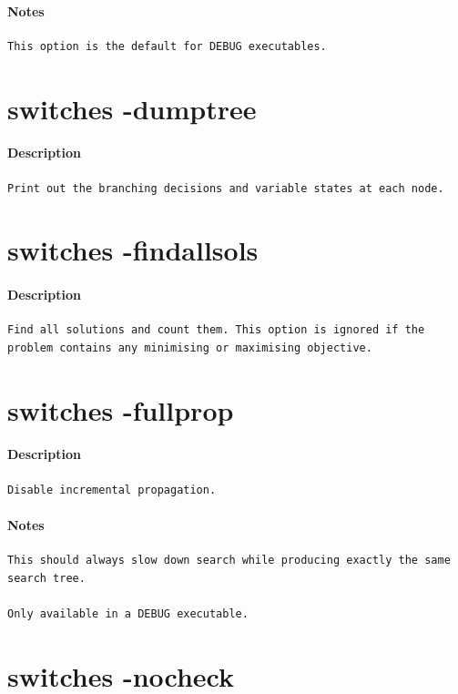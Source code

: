 \documentclass[oneside]{book}
\begin{document}
\paragraph{Notes}
{\footnotesize
\begin{verbatim}
This option is the default for DEBUG executables.
\end{verbatim}
}
\section{switches -dumptree}
\paragraph{Description}
{\footnotesize
\begin{verbatim}
Print out the branching decisions and variable states at each node.
\end{verbatim}
}
\section{switches -findallsols}
\paragraph{Description}
{\footnotesize
\begin{verbatim}
Find all solutions and count them. This option is ignored if the
problem contains any minimising or maximising objective.
\end{verbatim}
}
\section{switches -fullprop}
\paragraph{Description}
{\footnotesize
\begin{verbatim}
Disable incremental propagation.
\end{verbatim}
}
\paragraph{Notes}
{\footnotesize
\begin{verbatim}
This should always slow down search while producing exactly the same
search tree.

Only available in a DEBUG executable.
\end{verbatim}
}
\section{switches -nocheck}
\end{document}
